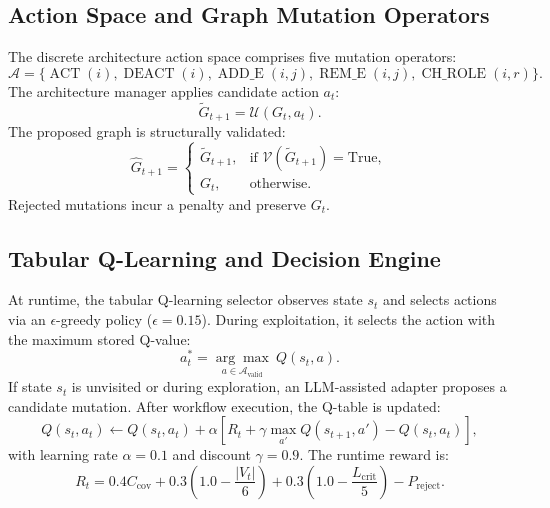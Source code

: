 \documentclass[conference]{IEEEtran}
\begin{document}
\subsection{Action Space and Graph Mutation Operators}
The discrete architecture action space comprises five mutation operators:
\begin{equation}
\mathcal{A} = \{\operatorname{ACT}(i), \operatorname{DEACT}(i), \operatorname{ADD\_E}(i,j), \operatorname{REM\_E}(i,j), \operatorname{CH\_ROLE}(i,r)\}.
\end{equation}
The architecture manager applies candidate action $a_t$:
\begin{equation}
\widetilde{G}_{t+1} = \mathcal{U}(G_t, a_t).
\end{equation}
The proposed graph is structurally validated:
\begin{equation}
\widehat{G}_{t+1} = \begin{cases}
\widetilde{G}_{t+1}, & \text{if } \mathcal{V}(\widetilde{G}_{t+1}) = \text{True}, \\
G_t, & \text{otherwise}.
\end{cases}
\end{equation}
Rejected mutations incur a penalty and preserve $G_t$.

\subsection{Tabular Q-Learning and Decision Engine}
At runtime, the tabular Q-learning selector observes state $s_t$ and selects actions via an $\epsilon$-greedy policy ($\epsilon = 0.15$). During exploitation, it selects the action with the maximum stored Q-value:
\begin{equation}
a_t^* = \underset{a \in \mathcal{A}_{\mathrm{valid}}}{\arg\max} \ Q(s_t, a).
\end{equation}
If state $s_t$ is unvisited or during exploration, an LLM-assisted adapter proposes a candidate mutation. After workflow execution, the Q-table is updated:
\begin{equation}
Q(s_t, a_t) \leftarrow Q(s_t, a_t) + \alpha \left[ R_t + \gamma \max_{a'} Q(s_{t+1}, a') - Q(s_t, a_t) \right],
\end{equation}
with learning rate $\alpha = 0.1$ and discount $\gamma = 0.9$. The runtime reward is:
\begin{equation}
R_t = 0.4 C_{\mathrm{cov}} + 0.3 \left(1.0 - \frac{|V_t|}{6}\right) + 0.3 \left(1.0 - \frac{L_{\mathrm{crit}}}{5}\right) - P_{\mathrm{reject}}.
\end{equation}
\end{document}
